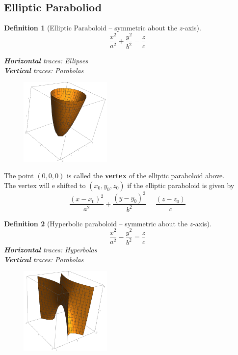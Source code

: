 \documentclass[12pt]{article}
\newtheorem{definition}{Definition}[section]
\theoremstyle{definition}
\begin{document}
\subsection{Elliptic Paraboliod}
\begin{definition}[Elliptic Paraboloid -- symmetric about the $z$-axis]
\hfill\\\normalfont 
\[
\frac{x^2}{a^2}+\frac{y^2}{b^2}=\frac{z}{c}
\]

\textbf{Horizontal} traces: Ellipses\\
\textbf{Vertical} traces: Parabolas
\begin{figure}[h]
\centering
\includegraphics[width = 0.4\textwidth]{2_1.png}
\end{figure}
\end{definition} 
The point $(0,0,0)$ is called the \textbf{vertex} of the elliptic paraboloid above.\\
The vertex will e shifted to $(x_0,y_0,z_0)$ if the elliptic paraboloid is given by
\[
\frac{(x-x_0)^2}{a^2}+\frac{(y-y_0)^2}{b^2}=\frac{(z-z_0)}{c}
\]
\begin{definition}[Hyperbolic paraboloid -- symmetric about the $z$-axis]
\hfill\\\normalfont
\[
\frac{x^2}{a^2}-\frac{y^2}{b^2}=\frac{z}{c}
\]
\textbf{Horizontal} traces: Hyperbolas\\
\textbf{Vertical} traces: Parabolas
\end{definition}
\begin{figure}[h]
\centering
\includegraphics[width = 0.4\textwidth]{2_2.png}
\end{figure}
\end{document}

